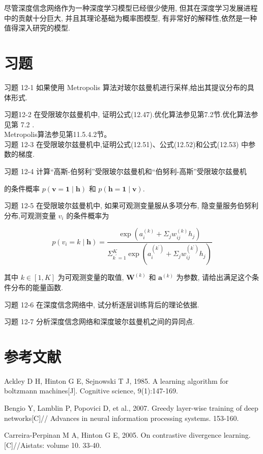 \documentclass[10pt]{article}
\begin{document}
尽管深度信念网络作为一种深度学习模型已经很少使用, 但其在深度学习发展进程中的贡献十分巨大, 并且其理论基础为概率图模型, 有非常好的解释性,依然是一种值得深入研究的模型.

\section*{习题}
习题 12-1 如果使用 Metropolis 算法对玻尔兹曼机进行采样,给出其提议分布的具体形式.

习题12-2 在受限玻尔兹曼机中, 证明公式(12.47).优化算法参见第7.2节.优化算法参见第 7.2 .\\
Metropolis算法参见第11.5.4.2节。\\
习题 12-3 在受限玻尔兹曼机中,证明公式(12.51)、公式(12.52)和公式(12.53) 中参数的梯度.

习题 12-4 计算“高斯-伯努利”受限玻尔兹曼机和“伯努利-高斯”受限玻尔兹曼机

的条件概率 $p(\boldsymbol{v}=\mathbf{1} \mid \boldsymbol{h})$ 和 $p(\boldsymbol{h}=\mathbf{1} \mid \boldsymbol{v})$.

习题 12-5 在受限玻尔兹曼机中, 如果可观测变量服从多项分布, 隐变量服务伯努利分布,可观测变量 $v_{i}$ 的条件概率为


\begin{equation*}
p\left(v_{i}=k \mid \boldsymbol{h}\right)=\frac{\exp \left(a_{i}^{(k)}+\Sigma_{j} w_{i j}^{(k)} h_{j}\right)}{\Sigma_{k^{\prime}=1}^{K} \exp \left(a_{i}^{\left(k^{\prime}\right)}+\Sigma_{j} w_{i j}^{\left(k^{\prime}\right)} h_{j}\right)} \tag{12.65}
\end{equation*}


其中 $k \in[1, K]$ 为可观测变量的取值, $\boldsymbol{W}^{(k)}$ 和 $\boldsymbol{a}^{(k)}$ 为参数, 请给出满足这个条件分布的能量函数.

习题 12-6 在深度信念网络中, 试分析逐层训练背后的理论依据.

习题 12-7 分析深度信念网络和深度玻尔兹曼机之间的异同点.

\section*{参考文献}
Ackley D H, Hinton G E, Sejnowski T J, 1985. A learning algorithm for boltzmann machines[J]. Cognitive science, 9(1):147-169.

Bengio Y, Lamblin P, Popovici D, et al., 2007. Greedy layer-wise training of deep networks[C]// Advances in neural information processing systems. 153-160.

Carreira-Perpinan M A, Hinton G E, 2005. On contrastive divergence learning.[C]//Aistats: volume 10. 33-40.
\end{document}

